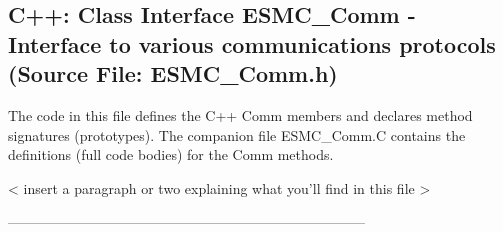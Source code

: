  
\parskip        0pt
\parindent      0pt
\baselineskip  11pt
 
\def\bv{\begin{verbatim}}
\def\ev{\end{verbatim}}
\def\be{\begin{equation}}
\def\ee{\end{equation}}
\def\bea{\begin{eqnarray}}
\def\eea{\end{eqnarray}}
\def\bi{\begin{itemize}}
\def\ei{\end{itemize}}
\def\bn{\begin{enumerate}}
\def\en{\end{enumerate}}
\def\bd{\begin{description}}
\def\ed{\end{description}}
\def\({\left (}
\def\){\right )}
\def\[{\left [}
\def\]{\right ]}
\def\<{\left  \langle}
\def\>{\right \rangle}
\def\cI{{\cal I}}
\def\diag{\mathop{\rm diag}}
\def\tr{\mathop{\rm tr}}


 
\subsection{C++:  Class Interface ESMC\_Comm - Interface to various communications protocols (Source File: ESMC\_Comm.h)}


  
  
   The code in this file defines the C++ Comm members and declares method 
   signatures (prototypes).  The companion file ESMC\_Comm.C contains
   the definitions (full code bodies) for the Comm methods.
  
   < insert a paragraph or two explaining what you'll find in this file >
  
  -----------------------------------------------------------------------------
   
